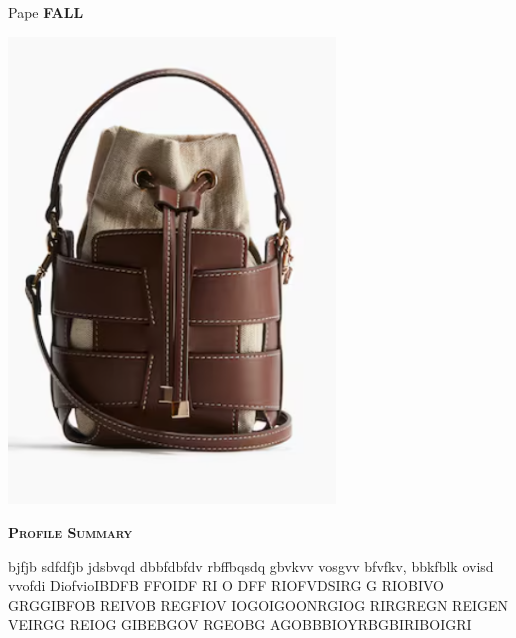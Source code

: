 \documentclass[11pt,a4paper]{article}
\newcommand{\headleft}[1]{%
  \vspace*{3ex}\textsc{\textbf{#1}}\par
  \vspace*{-1.5ex}\hrulefill\par\vspace*{0.7ex}}
\providecommand{\textscFALL}{\textsc{FALL}}
\begin{document}
\begin{minipage}[t]{0.33\textwidth}
\colorbox{cvblue}{\begin{minipage}[t][5mm][t]{\textwidth}\null\end{minipage}}
\vspace{-0.2ex}
\colorbox{cvblue!90}{%
\color{white}\textwidth
\begin{minipage}[t][293mm][t]{0.82\textwidth}\raggedright
\vspace*{2.5ex}

\Large Pape \textbf{\textscFALL}\normalsize

\null\hfill\includegraphics[width=0.65\textwidth]{6e141e23255b41d1b770b45844fd4251.png}\hfill\null

\vspace*{0.5ex}

\headleft{Profile Summary}
bjfjb sdfdfjb jdsbvqd dbbfdbfdv rbffbqsdq gbvkvv vosgvv bfvfkv, bbkfblk ovisd vvofdi  DiofvioIBDFB FFOIDF RI O DFF RIOFVDSIRG G RIOBIVO GRGGIBFOB REIVOB REGFIOV IOGOIGOONRGIOG RIRGREGN REIGEN VEIRGG REIOG GIBEBGOV RGEOBG AGOBBBIOYRBGBIRIBOIGRI


\end{minipage}}
\end{minipage}
\end{document}
